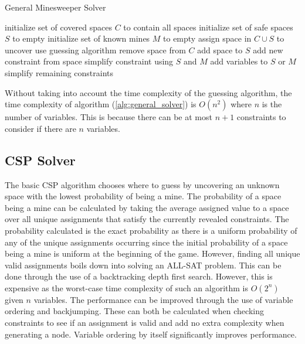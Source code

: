 \documentclass[letterpaper]{article}
\begin{document}
\begin{algorithm}[t]
\caption{General Minesweeper Solver}
\label{alg:general_solver}
\begin{algorithmic}[1]
\STATE initialize set of covered spaces $C$ to contain all spaces
\STATE initialize set of safe spaces $S$ to empty
\STATE initialize set of known mines $M$ to empty
		\STATE assign space in $C \cup S$ to uncover
	\ELSE
		\STATE use guessing algorithm
	\ENDIF
		\STATE remove space from $C$
		\STATE add space to $S$
		\STATE add new constraint from space
		\STATE simplify constraint using $S$ and $M$
			\STATE add variables to $S$ or $M$
		\ENDIF
		\STATE simplify remaining constraints
	\ENDIF
\ENDWHILE
\end{algorithmic}
\end{algorithm}

Without taking into account the time complexity of the guessing algorithm, the time complexity of algorithm (\ref{alg:general_solver}) is $O(n^2)$ where $n$ is the number of variables.  This is because there can be at most $n+1$ constraints to consider if there are $n$ variables.

\subsection{CSP Solver}
The basic CSP algorithm chooses where to guess by uncovering an unknown space with the lowest probability of being a mine.  The probability of a space being a mine can be calculated by taking the average assigned value to a space over all unique assignments that satisfy the currently revealed constraints.  The probability calculated is the exact probability as there is a uniform probability of any of the unique assignments occurring since the initial probability of a space being a mine is uniform at the beginning of the game.  However, finding all unique valid assignments boils down into solving an ALL-SAT problem.  This can be done through the use of a backtracking depth first search.  However, this is expensive as the worst-case time complexity of such an algorithm is $O(2^n)$ given $n$ variables.  The performance can be improved through the use of variable ordering and backjumping.  These can both be calculated when checking constraints to see if an assignment is valid and add no extra complexity when generating a node.  Variable ordering by itself significantly improves performance.
\end{document}
